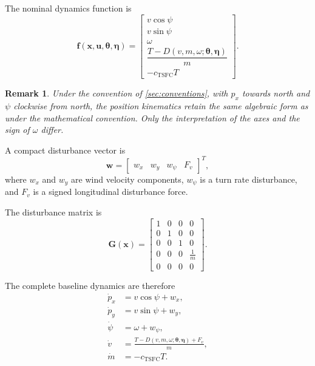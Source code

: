 \documentclass[11pt,a4paper]{article}
\newtheorem{remark}{Remark}
\newcommand{\vecx}{\bm{x}}
\newcommand{\vecu}{\bm{u}}
\newcommand{\vecw}{\bm{w}}
\newcommand{\vectheta}{\bm{\theta}}
\newcommand{\veceta}{\bm{\eta}}
\newcommand{\vecf}{\bm{f}}
\newcommand{\matG}{\bm{G}}
\begin{document}
The nominal dynamics function is
\begin{equation}
  \vecf(\vecx, \vecu, \vectheta, \veceta) =
  \begin{bmatrix}
    v\cos\psi \\[2pt]
    v\sin\psi \\[2pt]
    \omega \\[2pt]
    \dfrac{T - D(v, m, \omega; \vectheta, \veceta)}{m} \\[8pt]
    -c_{\mathrm{TSFC}} T
  \end{bmatrix}.
  \label{eq:f-nominal}
\end{equation}

\begin{remark}
Under the convention of \cref{sec:conventions}, with $p_x$ towards north and
$\psi$ clockwise from north, the position kinematics retain the same algebraic
form as under the mathematical convention. Only the interpretation of the axes
and the sign of $\omega$ differ.
\end{remark}

A compact disturbance vector is
\begin{equation}
  \vecw = \begin{bmatrix} w_x & w_y & w_\psi & F_v \end{bmatrix}^{T},
\end{equation}
where $w_x$ and $w_y$ are wind velocity components, $w_\psi$ is a turn rate
disturbance, and $F_v$ is a signed longitudinal disturbance force.

The disturbance matrix is
\begin{equation}
  \matG(\vecx) =
  \begin{bmatrix}
    1 & 0 & 0 & 0 \\
    0 & 1 & 0 & 0 \\
    0 & 0 & 1 & 0 \\
    0 & 0 & 0 & \tfrac{1}{m} \\
    0 & 0 & 0 & 0
  \end{bmatrix}.
\end{equation}

The complete baseline dynamics are therefore
\begin{align}
  \dot p_x &= v\cos\psi + w_x, \\
  \dot p_y &= v\sin\psi + w_y, \\
  \dot\psi &= \omega + w_\psi, \\
  \dot v   &= \frac{T - D(v, m, \omega; \vectheta, \veceta) + F_v}{m}, \\
  \dot m   &= -c_{\mathrm{TSFC}} T .
\end{align}
\end{document}
